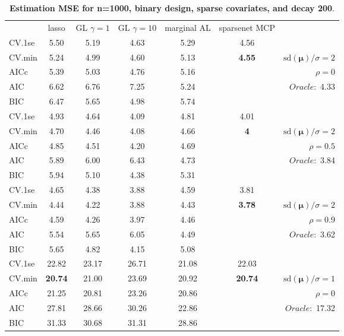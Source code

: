 \begin{table}\vspace{-.5cm}
\caption[l]{ { \bf Estimation MSE for n=1000, binary design, 
sparse covariates, and  decay  200}.}
\vspace{-.5cm}
\footnotesize{}
\begin{center}
\begin{tabular}{l*{5}{c}|r}
& lasso & GL $\gamma=1$ & GL $\gamma=10$ & marginal AL & sparsenet MCP  & \\
 \cline{1-7}
CV.1se & 5.50 & 5.19 & 4.63 & 5.29 & 4.56 & \\
CV.min & 5.24 & 4.99 & 4.60 & 5.13 & {\bf 4.55} &  $\mathrm{sd}(\mathbf{\mu})/\sigma=2$ \\
AICc & 5.39 & 5.03 & 4.76 & 5.16 & & $\rho=0$ \\
AIC & 6.62 & 6.76 & 7.25 & 5.24 & &  \multirow{2}{*}{$Oracle: $ 4.33} \\
BIC & 6.47 & 5.65 & 4.98 & 5.74 & &  \\
 \hline 
CV.1se & 4.93 & 4.64 & 4.09 & 4.81 & 4.01 & \\
CV.min & 4.70 & 4.46 & 4.08 & 4.66 & {\bf 4} &  $\mathrm{sd}(\mathbf{\mu})/\sigma=2$ \\
AICc & 4.85 & 4.51 & 4.20 & 4.69 & & $\rho=0.5$ \\
AIC & 5.89 & 6.00 & 6.43 & 4.73 & &  \multirow{2}{*}{$Oracle: $ 3.84} \\
BIC & 5.94 & 5.10 & 4.38 & 5.31 & &  \\
 \hline 
CV.1se & 4.65 & 4.38 & 3.88 & 4.59 & 3.81 & \\
CV.min & 4.44 & 4.22 & 3.88 & 4.43 & {\bf 3.78} &  $\mathrm{sd}(\mathbf{\mu})/\sigma=2$ \\
AICc & 4.59 & 4.26 & 3.97 & 4.46 & & $\rho=0.9$ \\
AIC & 5.54 & 5.65 & 6.05 & 4.49 & &  \multirow{2}{*}{$Oracle: $ 3.62} \\
BIC & 5.65 & 4.82 & 4.15 & 5.08 & &  \\
 \hline 
CV.1se & 22.82 & 23.17 & 26.71 & 21.08 & 22.03 & \\
CV.min & {\bf 20.74} & 21.00 & 23.69 & 20.92 & {\bf 20.74} &  $\mathrm{sd}(\mathbf{\mu})/\sigma=1$ \\
AICc & 21.25 & 20.81 & 23.26 & 20.86 & & $\rho=0$ \\
AIC & 27.81 & 28.66 & 30.26 & 22.86 & &  \multirow{2}{*}{$Oracle: $ 17.32} \\
BIC & 31.33 & 30.68 & 31.31 & 28.86 & &  \\

\end{tabular}
\end{center}
\end{table}
